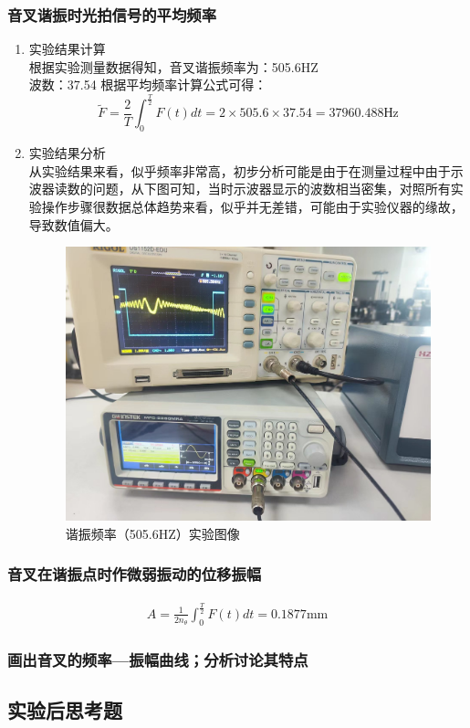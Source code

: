 \documentclass[dvipsnames, svgnames,a4paper,11pt]{article}
\begin{document}
	\subsubsection{音叉谐振时光拍信号的平均频率}
	\begin{enumerate}
		\item 实验结果计算\\
		根据实验测量数据得知，音叉谐振频率为：505.6HZ\\
		波数：37.54
	    根据平均频率计算公式可得：
	  $$\tilde{F}=\frac{2}{T}\int_{0}^{\frac{T}{2}}F(t)dt=2\times505.6\times37.54=37960.488\text{Нz}$$
	  \item 实验结果分析\\
	  从实验结果来看，似乎频率非常高，初步分析可能是由于在测量过程中由于示波器读数的问题，从下图可知，当时示波器显示的波数相当密集，对照所有实验操作步骤很数据总体趋势来看，似乎并无差错，可能由于实验仪器的缘故，导致数值偏大。

	  \begin{figure}[H]
		\centering
		\includegraphics[width=0.4\linewidth]{images/505.6}
		\caption{谐振频率（505.6HZ）实验图像}
		\label{505.6}
	\end{figure}
	  
	\end{enumerate}
	
	\subsubsection{ 音叉在谐振点时作微弱振动的位移振幅}
	$$\begin{aligned}A=\frac{1}{2n_\theta}\int_0^{\frac{T}{2}}F(t)dt=0.1877\text{mm}\end{aligned}$$
	\subsubsection{ 画出音叉的频率—振幅曲线；分析讨论其特点}
	\subsection{实验后思考题}
	
\end{document}
